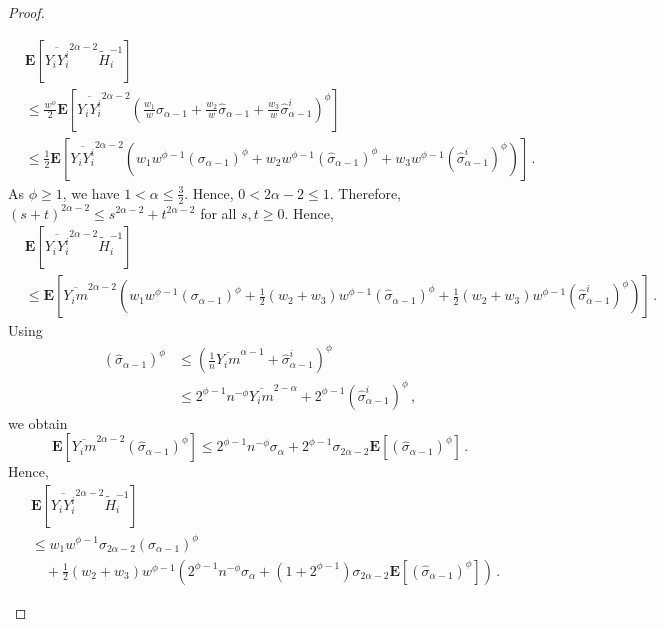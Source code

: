 \documentclass{article}
\newcommand{\lab}{\left[} %
\newcommand{\rab}{\right]} %
\newcommand{\ab}[1]{\lab #1 \rab} %
\newcommand{\abOf}[1]{\!\ab{#1}} %
\newcommand{\lb}{\left(} %
\newcommand{\rb}{\right)} %
\newcommand{\br}[1]{\lb #1 \rb} %
\newcommand{\E}{\mathbf{E}} %
\newcommand{\EOf}[1]{\E\abOf{#1}}
\newcommand{\eqcm}{\,,} %
\newcommand{\eqfs}{\,.}
\newcommand{\ol}[2]{\overline{#1#2}}
\begin{document}
\begin{proof}
\begin{enumerate}[label=(\roman*)]
\begin{align}
		&\EOf{
			\ol {Y_i}{Y_i^i}^{2\alpha-2}
			\tilde H_i^{-1}
		}
		\\&\leq
		\frac{w^\phi}2
		\EOf{
			\ol {Y_i}{Y_i^i}^{2\alpha-2}
			\br{
				\frac{w_1}{w} \sigma_{\alpha-1}
				+
				\frac{w_2}{w} \hat\sigma_{\alpha-1}
				+
				\frac{w_3}{w} \hat\sigma^i_{\alpha-1}
			}^{\phi}
		}
		\\&\leq
		\frac{1}2
		\EOf{
			\ol {Y_i}{Y_i^i}^{2\alpha-2}
			\br{
				w_1 w^{\phi-1} (\sigma_{\alpha-1})^{\phi}
				+
				w_2 w^{\phi-1} (\hat\sigma_{\alpha-1})^{\phi}
				+
				w_3 w^{\phi-1} (\hat\sigma^i_{\alpha-1})^{\phi}
			}
		}
        \eqfs
	\end{align}	
	As $\phi\geq 1$, we have $1 < \alpha \leq \frac32$. Hence, $0< 2\alpha-2\leq 1$. Therefore, $(s+t)^{2\alpha-2} \leq s^{2\alpha-2} + t^{2\alpha-2}$ for all $s,t\geq 0$.
	Hence,
		\begin{align}
		&\EOf{
			\ol {Y_i}{Y_i^i}^{2\alpha-2}
			\tilde H_i^{-1}
		}
		\\&\leq
		\EOf{
			\ol {Y_i}{m}^{2\alpha-2}
			\br{
				w_1 w^{\phi-1} (\sigma_{\alpha-1})^{\phi}
				+
				\frac12(w_2 + w_3) w^{\phi-1} (\hat\sigma_{\alpha-1})^{\phi}
				+
				\frac12(w_2 + w_3) w^{\phi-1} (\hat\sigma^i_{\alpha-1})^{\phi}
			}
		}
        \eqfs
	\end{align}	
	Using 
	\begin{align}
		(\hat\sigma_{\alpha-1})^{\phi} 
		&\leq
		\br{\frac1n \ol{Y_i}m^{\alpha-1}+\hat\sigma^i_{\alpha-1}}^\phi
		\\&\leq
		2^{\phi-1} n^{-\phi} \ol{Y_i}m^{2-\alpha} + 2^{\phi-1} (\hat\sigma^i_{\alpha-1})^{\phi}
        \eqcm
	\end{align}
	we obtain
	\begin{equation}
		\EOf{
			\ol {Y_i}{m}^{2\alpha-2}
			(\hat\sigma_{\alpha-1})^{\phi}
		}
		\leq
		2^{\phi-1} n^{-\phi} \sigma_{\alpha} + 2^{\phi-1} \sigma_{2\alpha-2} \EOf{(\hat\sigma_{\alpha-1})^{\phi}}
        \eqfs
	\end{equation}
	Hence,
    \begin{align}
        &\EOf{
            \ol {Y_i}{Y_i^i}^{2\alpha-2}
            \tilde H_i^{-1}
        }
        \\&\leq
        w_1 w^{\phi-1} \sigma_{2\alpha-2} (\sigma_{\alpha-1})^\phi
        \\&\quad +
        \frac12 (w_2+w_3) w^{\phi-1} \br{
            2^{\phi-1} n^{-\phi} \sigma_{\alpha} + \br{1+2^{\phi-1}} \sigma_{2\alpha-2} \EOf{(\hat\sigma_{\alpha-1})^{\phi}}
        }
        \eqfs
    \end{align}
	\end{enumerate}
\end{proof}
\end{document}
